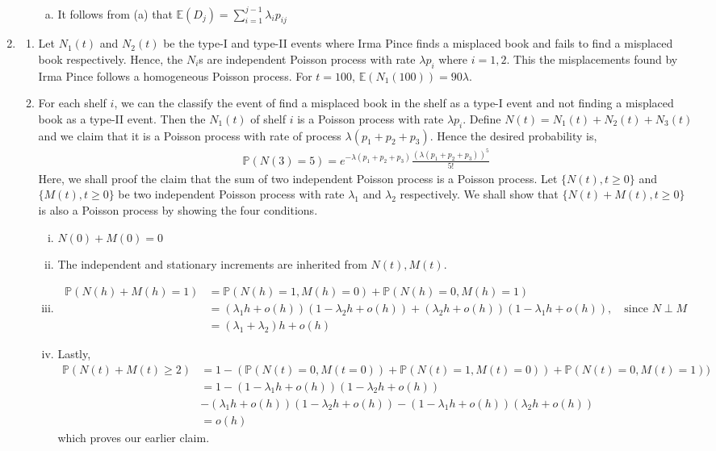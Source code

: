 \documentclass[a4paper,10pt]{article}
\theoremstyle{definition}
\begin{document}
\begin{enumerate}
\begin{enumerate}[(i)]
\begin{enumerate}[(a)]
\item It follows from (a) that $\mathbb{E}(D_j)=\sum_{i=1}^{j-1}\lambda_ip_{ij}$
\end{enumerate}

\end{enumerate}

\item
\begin{enumerate}
\item Let $N_1(t)$ and $N_2(t)$ be the type-I and type-II events where Irma Pince finds a misplaced book and fails to find a misplaced book respectively. Hence, the $N_i$s are independent Poisson process with rate $\lambda p_i$ where $i=1,2$. This the misplacements found by Irma Pince follows a homogeneous Poisson process. For $t=100$, $\mathbb{E}(N_1(100))=90 \lambda$.
\item For each shelf $i$, we can the classify the event of find a misplaced book in the shelf as a type-I event and not finding a misplaced book as a type-II event. Then the $N_1(t)$ of shelf $i$ is a Poisson process with rate $\lambda p_i$. Define $N(t)=N_1(t)+N_2(t)+N_3(t)$ and we claim that it is a Poisson process with rate of process $\lambda(p_1+p_2+p_3)$. Hence the desired probability is,
\begin{align*}
\mathbb{P}(N(3)=5)=e^{-\lambda(p_1+p_2+p_3)}\frac{(\lambda(p_1+p_2+p_3))^5}{5!}
\end{align*}
Here, we shall proof the claim that the sum of two independent Poisson process is a Poisson process. Let $\{N(t), t\geq 0\}$ and $\{M(t), t\geq 0\}$ be two independent Poisson process with rate $\lambda_1$ and $\lambda_2$ respectively. We shall show that $\{N(t)+M(t), t\geq 0\}$ is also a Poisson process by showing the four conditions.
\begin{enumerate}[(i)]
\item $N(0)+M(0)=0$
\item The independent and stationary increments are inherited from $N(t), M(t)$.
\item 
\begin{align*}
\mathbb{P}(N(h)+M(h)=1)&=\mathbb{P}(N(h)=1,M(h)=0)+\mathbb{P}(N(h)=0,M(h)=1)\\
&=(\lambda_1h+o(h))(1-\lambda_2h+o(h))+(\lambda_2h+o(h))(1-\lambda_1h+o(h)),\quad \text{since $N \perp M$}\\
&=(\lambda_1+\lambda_2)h+o(h)
\end{align*}
\item Lastly,
\begin{align*}
\mathbb{P}(N(t)+M(t)\geq 2)&= 1- (\mathbb{P}(N(t)=0,M(t=0))+\mathbb{P}(N(t)=1,M(t)=0))+\mathbb{P}(N(t)=0,M(t)=1))\\
&= 1- (1-\lambda_1h+o(h))(1-\lambda_2h+o(h))\\
&-(\lambda_1h+o(h))(1-\lambda_2h+o(h))-(1-\lambda_1h+o(h))(\lambda_2h+o(h))\\
&=o(h)
\end{align*}
which proves our earlier claim.
\end{enumerate}


\end{enumerate}
\end{enumerate}
\end{document}
